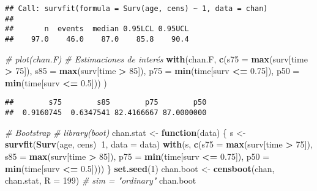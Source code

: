 \documentclass[
]{book}
\newenvironment{Shaded}{\begin{snugshade}}{\end{snugshade}}
\newcommand{\CommentTok}[1]{\textcolor[rgb]{0.56,0.35,0.01}{\textit{#1}}}
\newcommand{\ControlFlowTok}[1]{\textcolor[rgb]{0.13,0.29,0.53}{\textbf{#1}}}
\newcommand{\DataTypeTok}[1]{\textcolor[rgb]{0.13,0.29,0.53}{#1}}
\newcommand{\DecValTok}[1]{\textcolor[rgb]{0.00,0.00,0.81}{#1}}
\newcommand{\FloatTok}[1]{\textcolor[rgb]{0.00,0.00,0.81}{#1}}
\newcommand{\KeywordTok}[1]{\textcolor[rgb]{0.13,0.29,0.53}{\textbf{#1}}}
\newcommand{\NormalTok}[1]{#1}
\newcommand{\OperatorTok}[1]{\textcolor[rgb]{0.81,0.36,0.00}{\textbf{#1}}}
\newcommand{\StringTok}[1]{\textcolor[rgb]{0.31,0.60,0.02}{#1}}
\theoremstyle{break}
\theoremstyle{definition}
\theoremstyle{definition}
\theoremstyle{definition}
\theoremstyle{remark}
\begin{document}
\begin{verbatim}
## Call: survfit(formula = Surv(age, cens) ~ 1, data = chan)
## 
##       n  events  median 0.95LCL 0.95UCL 
##    97.0    46.0    87.0    85.8    90.4
\end{verbatim}

\begin{Shaded}
\begin{Highlighting}[]
\CommentTok{# plot(chan.F)}
\CommentTok{# Estimaciones de interés}
\KeywordTok{with}\NormalTok{(chan.F, }
    \KeywordTok{c}\NormalTok{(}\DataTypeTok{s75 =} \KeywordTok{max}\NormalTok{(surv[time }\OperatorTok{>}\StringTok{ }\DecValTok{75}\NormalTok{]), }\DataTypeTok{s85 =} \KeywordTok{max}\NormalTok{(surv[time }\OperatorTok{>}\StringTok{ }\DecValTok{85}\NormalTok{]),}
      \DataTypeTok{p75 =} \KeywordTok{min}\NormalTok{(time[surv }\OperatorTok{<=}\StringTok{ }\FloatTok{0.75}\NormalTok{]), }\DataTypeTok{p50 =} \KeywordTok{min}\NormalTok{(time[surv }\OperatorTok{<=}\StringTok{ }\FloatTok{0.5}\NormalTok{])) }
\NormalTok{)}
\end{Highlighting}
\end{Shaded}

\begin{verbatim}
##        s75        s85        p75        p50 
##  0.9160745  0.6347541 82.4166667 87.0000000
\end{verbatim}

\begin{Shaded}
\begin{Highlighting}[]
\CommentTok{# Bootstrap}
\CommentTok{# library(boot)}
\NormalTok{chan.stat <-}\StringTok{ }\ControlFlowTok{function}\NormalTok{(data) \{}
\NormalTok{    s <-}\StringTok{ }\KeywordTok{survfit}\NormalTok{(}\KeywordTok{Surv}\NormalTok{(age, cens)}\OperatorTok{~}\DecValTok{1}\NormalTok{, }\DataTypeTok{data =}\NormalTok{ data)}
    \KeywordTok{with}\NormalTok{(s, }\KeywordTok{c}\NormalTok{(}\DataTypeTok{s75 =} \KeywordTok{max}\NormalTok{(surv[time }\OperatorTok{>}\StringTok{ }\DecValTok{75}\NormalTok{]), }\DataTypeTok{s85 =} \KeywordTok{max}\NormalTok{(surv[time }\OperatorTok{>}\StringTok{ }\DecValTok{85}\NormalTok{]),}
            \DataTypeTok{p75 =} \KeywordTok{min}\NormalTok{(time[surv }\OperatorTok{<=}\StringTok{ }\FloatTok{0.75}\NormalTok{]), }\DataTypeTok{p50 =} \KeywordTok{min}\NormalTok{(time[surv }\OperatorTok{<=}\StringTok{ }\FloatTok{0.5}\NormalTok{])))}
\NormalTok{\}}
\KeywordTok{set.seed}\NormalTok{(}\DecValTok{1}\NormalTok{)}
\NormalTok{chan.boot <-}\StringTok{ }\KeywordTok{censboot}\NormalTok{(chan, chan.stat, }\DataTypeTok{R =} \DecValTok{199}\NormalTok{) }\CommentTok{# sim = "ordinary"}
\NormalTok{chan.boot}
\end{Highlighting}
\end{Shaded}
\end{document}
